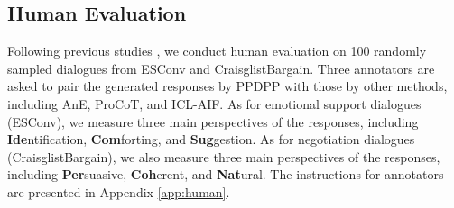 \documentclass{article} %
\begin{document}
\subsection{Human Evaluation}
Following previous studies \citep{esconv,iclr21-negotiate-strategy}, we conduct human evaluation on 100 randomly sampled dialogues from ESConv and CraisglistBargain. Three annotators are asked to pair the generated responses by PPDPP with those by other methods, including AnE, ProCoT, and ICL-AIF. 
As for emotional support dialogues (ESConv), we measure three main perspectives of the responses, including \textbf{Ide}ntification, \textbf{Com}forting, and \textbf{Sug}gestion. 
As for negotiation dialogues (CraisglistBargain), we also measure three main perspectives of the responses, including \textbf{Per}suasive, \textbf{Coh}erent, and \textbf{Nat}ural. The instructions for annotators are presented in Appendix \ref{app:human}. 
\begin{table}[t]
\vspace{-0.2cm}
    \caption{Human evaluation results.}
    \vspace{5pt}
    \centering
    \begin{adjustbox}{width=\textwidth}
    \end{adjustbox}
    \label{tab:human_eval}
    \vspace{-0.5cm}
\end{table}
\end{document}
